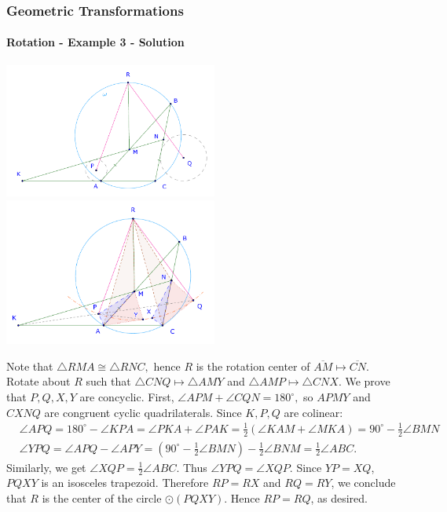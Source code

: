 \documentclass[8pt,xcolor=table,dvipsnames]{beamer}
\newcommand{\dg}{^\circ}
\begin{document}
\begin{frame}[t]
    \frametitle{Geometric Transformations}
    \framesubtitle{Rotation - Example 3 - Solution}
    \begin{center}
        \begin{overprint}
            \centering\includegraphics[width=7cm]{./svg/pdf/24-25-t3-p15-0.pdf}
            \centering\includegraphics[width=7cm]{./svg/pdf/24-25-t3-p15.pdf}
        \end{overprint}        
    \end{center}
    \begin{overprint}
        Note that $\triangle RMA \cong \triangle RNC,$ hence $R$ is the rotation center of $\overline{AM} \mapsto \overline{CN}$.
        Rotate about $R$ such that $\triangle CNQ \mapsto \triangle AMY$ and $\triangle AMP \mapsto \triangle CNX$.
        We prove that $P,Q,X,Y$ are concyclic.
        First, $\angle APM+\angle CQN=180^{\circ},$ so $APMY$ and $CXNQ$ are congruent cyclic quadrilaterals.
        Since $K, P, Q$ are colinear:
        \[
            \begin{aligned}
                &\angle APQ = 180\dg - \angle KPA = \angle PKA + \angle PAK = \tfrac{1}{2}\left(\angle KAM+\angle MKA\right)
                = 90\dg - \tfrac{1}{2} \angle BMN\\
                &\angle YPQ = \angle APQ-\angle APY=  (90^{\circ}-\tfrac{1}{2} \angle BMN) - \tfrac{1}{2}\angle BNM
                =\tfrac{1}{2}\angle ABC. 
            \end{aligned}
        \]
        Similarly, we get $\angle XQP=\tfrac{1}{2}\angle ABC$. Thus $\angle YPQ=\angle XQP.$
        Since $YP=XQ$, $PQXY$ is an isosceles trapezoid.
        Therefore $RP=RX$ and $RQ=RY$, we conclude that $R$ is the center of the circle $\odot(PQXY)$.
        Hence $RP=RQ$, as desired.
    \end{overprint}        
\end{frame}
\end{document}
